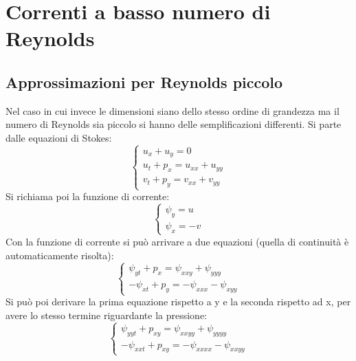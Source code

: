 %
\section{Correnti a basso numero di Reynolds}
\subsection{Approssimazioni per Reynolds piccolo}
Nel caso in cui invece le dimensioni siano dello stesso ordine di grandezza ma il numero di Reynolds sia piccolo si hanno delle semplificazioni differenti.
Si parte dalle equazioni di Stokes:
%
	\begin{equation*}
		\left\{
			\begin{gathered}
				u_x + u_y = 0\\
				u_t + p_x = u_{xx} + u_{yy}\\
				v_t + p_y = v_{xx} + v_{yy}
			\end{gathered}
		\right.
	\end{equation*}
%
Si richiama poi la funzione di corrente:
%
	\begin{equation*}
		\left\{
			\begin{gathered}
				\psi_y = u\\
				\psi_x = -v
			\end{gathered}
		\right.
	\end{equation*}
%
Con la funzione di corrente si può arrivare a due equazioni (quella di continuità è automaticamente risolta):
%
	\begin{equation*}
		\left\{
			\begin{gathered}
				\psi_{yt} + p_x = \psi_{xxy} + \psi_{yyy}\\
				- \psi_{xt} + p_y = - \psi_{xxx} - \psi_{xyy}
			\end{gathered}
		\right.
	\end{equation*}
%
Si può poi derivare la prima equazione rispetto a y e la seconda rispetto ad x, per avere lo stesso termine riguardante la pressione:
%
	\begin{equation*}
		\left\{
			\begin{gathered}
				\psi_{yyt} + p_{xy} = \psi_{xxyy} + \psi_{yyyy}\\
				- \psi_{xxt} + p_{xy} = - \psi_{xxxx} - \psi_{xxyy}
			\end{gathered}
		\right.
	\end{equation*}
